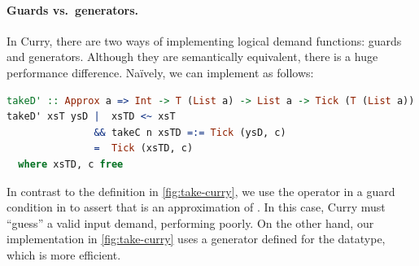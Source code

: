 % 

\paragraph{Guards vs.\ generators.}
In Curry, there are two ways of implementing logical demand functions: guards
and generators. Although they are semantically equivalent, there is a huge
performance difference. Na\"ively, we can implement  as follows:
\begin{lstlisting}[language=Curry]
takeD' :: Approx a => Int -> T (List a) -> List a -> Tick (T (List a))
takeD' xsT ysD |  xsTD <~ xsT
               && takeC n xsTD =:= Tick (ysD, c)
               =  Tick (xsTD, c)
  where xsTD, c free
\end{lstlisting}
In contrast to the definition in \cref{fig:take-curry}, we use the \cdc{<~}
operator in a guard condition in  to assert that  is an
approximation of . In this case, Curry must ``guess'' a valid input
demand, performing poorly. On the other hand, our implementation in
\cref{fig:take-curry} uses a generator  defined for the 
datatype, which is more efficient.


